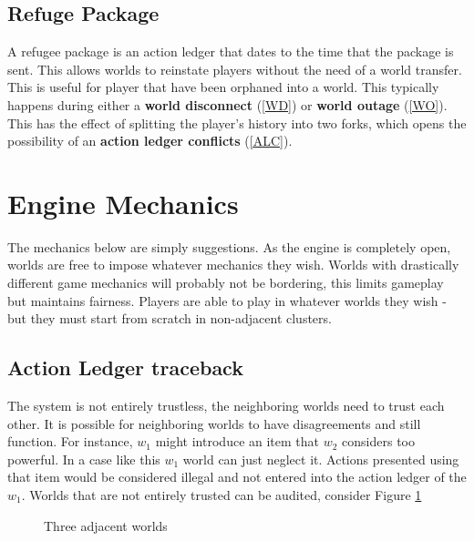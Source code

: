 \documentclass[runningheads,a4paper]{llncs}
\begin{document}
\subsection{Refuge Package}
\label{RP}
A refugee package is an action ledger that dates to the time that the package is sent. This allows worlds to reinstate players without the need of a world transfer. This is useful for player that have been orphaned into a world. This typically happens during either a \textbf{world disconnect} (\ref{WD}) or \textbf{world outage} (\ref{WO}). This has the effect of splitting the player's history into two forks, which opens the possibility of an \textbf{action ledger conflicts} (\ref{ALC}).

\section{Engine Mechanics} 
The mechanics below are simply suggestions. As the engine is completely open, worlds are free to impose whatever mechanics they wish. Worlds with drastically different game mechanics will probably not be bordering, this limits gameplay but maintains fairness. Players are able to play in whatever worlds they wish - but they must start from scratch in non-adjacent clusters.


\subsection{Action Ledger traceback}
\label{ALT}
The system is not entirely trustless, the neighboring worlds need to trust each other. It is possible for neighboring worlds to have disagreements and still function. For instance, $w_1$ might introduce an item that $w_2$ considers too powerful. In a case like this $w_1$ world can just neglect it. Actions presented using that item would be considered illegal and not entered into the action ledger of the $w_1$. Worlds that are not entirely trusted can be audited, consider Figure \ref{ThreeW} 

\begin{figure}
\caption{Three adjacent worlds}
\label{ThreeW}
\begin{center}
\end{center}
\end{figure}
\end{document}

